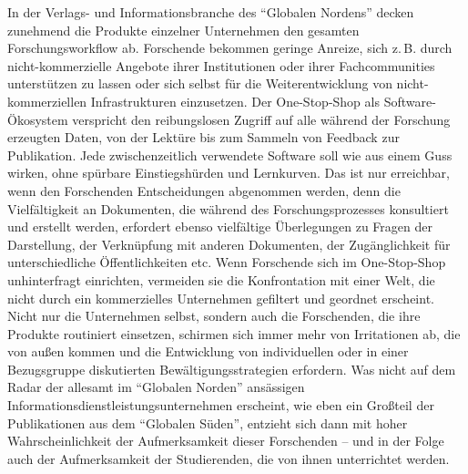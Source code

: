 \documentclass[a4paper,
fontsize=11pt,
oneside,
numbers=noperiodatend,
parskip=half-,
bibliography=totoc,
final
]{scrartcl}
\begin{document}
In der Verlags- und Informationsbranche des \enquote{Globalen Nordens}
decken zunehmend die Produkte einzelner Unternehmen den gesamten
Forschungsworkflow ab. Forschende bekommen geringe Anreize, sich z. B.
durch nicht-kommerzielle Angebote ihrer Institutionen oder ihrer
Fachcommunities unterstützen zu lassen oder sich selbst für die
Weiterentwicklung von nicht-kommerziellen Infrastrukturen einzusetzen.
Der One-Stop-Shop als Software-Ökosystem verspricht den reibungslosen
Zugriff auf alle während der Forschung erzeugten Daten, von der Lektüre
bis zum Sammeln von Feedback zur Publikation. Jede zwischenzeitlich
verwendete Software soll wie aus einem Guss wirken, ohne spürbare
Einstiegshürden und Lernkurven. Das ist nur erreichbar, wenn den
Forschenden Entscheidungen abgenommen werden, denn die Vielfältigkeit an
Dokumenten, die während des Forschungsprozesses konsultiert und erstellt
werden, erfordert ebenso vielfältige Überlegungen zu Fragen der
Darstellung, der Verknüpfung mit anderen Dokumenten, der Zugänglichkeit
für unterschiedliche Öffentlichkeiten etc. Wenn Forschende sich im
One-Stop-Shop unhinterfragt einrichten, vermeiden sie die Konfrontation
mit einer Welt, die nicht durch ein kommerzielles Unternehmen gefiltert
und geordnet erscheint. Nicht nur die Unternehmen selbst, sondern auch
die Forschenden, die ihre Produkte routiniert einsetzen, schirmen sich
immer mehr von Irritationen ab, die von außen kommen und die Entwicklung
von individuellen oder in einer Bezugsgruppe diskutierten
Bewältigungsstrategien erfordern. Was nicht auf dem Radar der allesamt
im \enquote{Globalen Norden} ansässigen
Informationsdienstleistungsunternehmen erscheint, wie eben ein Großteil
der Publikationen aus dem \enquote{Globalen Süden}, entzieht sich dann
mit hoher Wahrscheinlichkeit der Aufmerksamkeit dieser Forschenden --
und in der Folge auch der Aufmerksamkeit der Studierenden, die von ihnen
unterrichtet werden.
\end{document}
